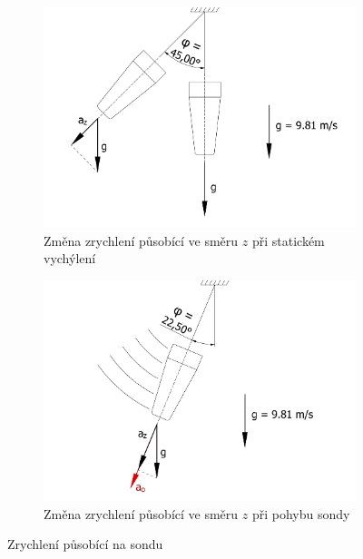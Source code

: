 \documentclass[twoside]{ctuthesis}
\theoremstyle{plain}
\theoremstyle{definition}
\theoremstyle{note}
\begin{document}
	\begin{figure}[hbtp]
		\centering
		\begin{subfigure}{.49\textwidth}
			\centering
			\includegraphics[width=\textwidth]{Figures/sonda_naklon_acc.pdf}
			\caption{Změna zrychlení působící ve směru $z$ při statickém vychýlení}
			\label{fig:sonda:naklon}
		\end{subfigure}%
		\begin{subfigure}{.49\textwidth}
			\centering
			\includegraphics[width=\textwidth]{Figures/sonda_naklon_acc_odst.pdf}
			\caption{Změna zrychlení působící ve směru $z$ při pohybu sondy}
			\label{fig:sonda:naklon:odst}
		\end{subfigure}
		\caption{Zrychlení působící na sondu}
		\label{fig:sonda:naklon:main}
	\end{figure}
\end{document}
